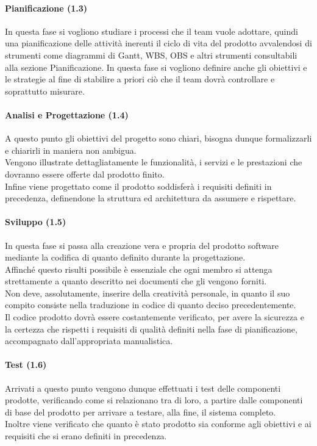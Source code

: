 \paragraph{Pianificazione (1.3)}
In questa fase si vogliono studiare i processi che il team vuole adottare, quindi una pianificazione delle attività inerenti il ciclo di vita del prodotto avvalendosi di strumenti come diagrammi di Gantt, WBS, OBS e altri strumenti consultabili alla sezione Pianificazione. In questa fase si vogliono definire anche gli obiettivi e le strategie al fine di stabilire a priori ciò che il team dovrà controllare e soprattutto misurare.

\paragraph{Analisi e Progettazione (1.4)}
A questo punto gli obiettivi del progetto sono chiari, bisogna dunque formalizzarli e chiarirli in maniera non ambigua.\\
Vengono illustrate dettagliatamente le funzionalità, i servizi e le prestazioni che dovranno essere offerte dal prodotto finito.\\
Infine viene progettato come il prodotto soddisferà i requisiti definiti in precedenza, definendone la struttura ed architettura da assumere e rispettare.

\paragraph{Sviluppo (1.5)}
In questa fase si passa alla creazione vera e propria del prodotto software mediante la codifica di quanto definito durante la progettazione.\\
Affinché questo risulti possibile è essenziale che ogni membro si attenga strettamente a quanto descritto nei documenti che gli vengono forniti.\\
Non deve, assolutamente, inserire della creatività personale, in quanto il suo compito consiste nella traduzione in codice di quanto deciso precedentemente.\\
Il codice prodotto dovrà essere costantemente verificato, per avere la sicurezza e la certezza che rispetti i requisiti di qualità definiti nella fase di pianificazione, accompagnato dall'appropriata manualistica.

\paragraph{Test (1.6)}
Arrivati a questo punto vengono dunque effettuati i test delle componenti prodotte, verificando come si relazionano tra di loro, a partire dalle componenti di base del prodotto per arrivare a testare, alla fine, il sistema completo.\\
Inoltre viene verificato che quanto è stato prodotto sia conforme agli obiettivi e ai requisiti che si erano definiti in precedenza.

